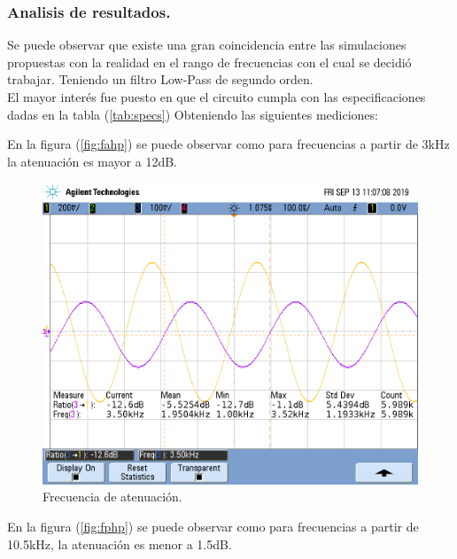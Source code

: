 \documentclass[a4paper]{article}
\begin{document}
\subsubsection{Analisis de resultados.}
Se puede observar que existe una gran coincidencia entre las simulaciones propuestas con la realidad en el rango de frecuencias con el cual se decidió trabajar. Teniendo un filtro Low-Pass de segundo orden.\\
El mayor interés fue puesto en que el circuito cumpla con las especificaciones dadas en la tabla (\ref{tab:specs})
Obteniendo las siguientes mediciones:


En la figura (\ref{fig:fahp}) se puede observar como para frecuencias a partir de 3kHz la atenuación es mayor a 12dB.
\begin{figure}[H]	
	\centering
	\includegraphics[width=\textwidth]{ImagenesEj2/MedicionesGrilla/fa_lp.png}
	\caption{Frecuencia de atenuación.}
	\label{fig:falp}
\end{figure}

En la figura (\ref{fig:fphp}) se puede observar como para frecuencias a partir de 10.5kHz, la atenuación es menor a 1.5dB.
\end{document}
